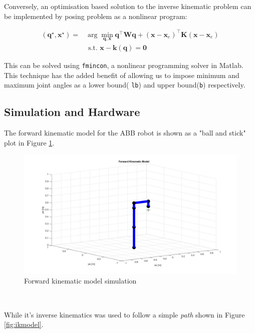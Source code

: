 \documentclass{UoNMCHA}
\numberwithin{equation}{section}
\begin{document}
Conversely, an optimisation based solution to the inverse kinematic problem can be implemented by posing problem as a nonlinear program: 

\begin{equation}
	\begin{aligned}
	\left(\mathbf{q}^{\star}, \mathbf{x}^{\star}\right)=& \arg \min _{\mathbf{q}, \mathbf{x}} \mathbf{q}^{\top} \mathbf{W} \mathbf{q}+\left(\mathbf{x}-\mathbf{x}_{e}\right)^{\top} \mathbf{K}\left(\mathbf{x}-\mathbf{x}_{e}\right) \\
	& \text { s.t. } \mathbf{x}-\mathbf{k}(\mathbf{q})=\mathbf{0}
	\end{aligned} 
\end{equation}

This can be solved using \texttt{fmincon}, a nonlinear programming solver in Matlab. This technique has the added benefit of allowing us to impose minimum and maximum joint angles as a lower bound( \texttt{lb}) and upper bound(\texttt{b}) respectively. \


\subsection{Simulation and Hardware}

The forward kinematic model for the ABB robot is shown as a "ball and stick" plot in Figure \ref{fig:fkmod}.

\begin{figure}[H]
	\begin{center}
		\includegraphics[width=.8\linewidth]{Figures/fkinmodel}
		\caption{Forward kinematic model simulation}
		\label{fig:fkmod}
	\end{center}
\end{figure}\

While it's inverse kinematics was used to follow a simple \textit{path} shown in Figure \ref{fig:ikmodel}.
\end{document}
